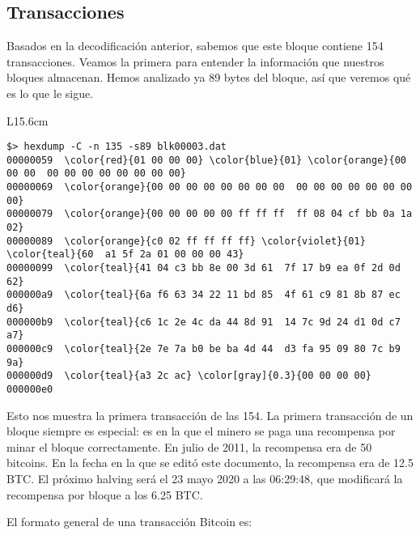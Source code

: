 \documentclass[10pt, a4paper]{article}
\theoremstyle{theorem-style}
\theoremstyle{theorem-style}
\theoremstyle{definition-style}
\theoremstyle{remark-style}
\theoremstyle{example-style}
\theoremstyle{definition-style}
\theoremstyle{remark-style}
\begin{document}
\subsection{Transacciones}

Basados en la decodificación anterior, sabemos que este bloque contiene 154 transacciones. Veamos la primera para entender la información que nuestros bloques almacenan. Hemos analizado ya 89 bytes del bloque, así que veremos qué es lo que le sigue.

\begin{table}[h]
\begin{tabular}{L{15.6cm}}
\begin{minipage}{3in}
\vspace{0.3cm}
\begin{Verbatim}[commandchars=\\\{\}]
$> hexdump -C -n 135 -s89 blk00003.dat
00000059  \color{red}{01 00 00 00} \color{blue}{01} \color{orange}{00 00 00  00 00 00 00 00 00 00 00}
00000069  \color{orange}{00 00 00 00 00 00 00 00  00 00 00 00 00 00 00 00}
00000079  \color{orange}{00 00 00 00 00 ff ff ff  ff 08 04 cf bb 0a 1a 02}
00000089  \color{orange}{c0 02 ff ff ff ff} \color{violet}{01} \color{teal}{60  a1 5f 2a 01 00 00 00 43}
00000099  \color{teal}{41 04 c3 bb 8e 00 3d 61  7f 17 b9 ea 0f 2d 0d 62}
000000a9  \color{teal}{6a f6 63 34 22 11 bd 85  4f 61 c9 81 8b 87 ec d6}
000000b9  \color{teal}{c6 1c 2e 4c da 44 8d 91  14 7c 9d 24 d1 0d c7 a7}
000000c9  \color{teal}{2e 7e 7a b0 be ba 4d 44  d3 fa 95 09 80 7c b9 9a}
000000d9  \color{teal}{a3 2c ac} \color[gray]{0.3}{00 00 00 00}
000000e0
\end{Verbatim}
\vspace{0cm}
\end{minipage}
\end{tabular}
\end{table}

Esto nos muestra la primera transacción de las 154. La primera transacción de un bloque siempre es especial: es en la que el minero se paga una recompensa por minar el bloque correctamente. En julio de 2011, la recompensa era de 50 bitcoins. En la fecha en la que se editó este documento, la recompensa era de 12.5 BTC. El próximo halving será el 23 mayo 2020 a las 06:29:48, que modificará la recompensa por bloque a los 6.25 BTC.

El formato general de una transacción Bitcoin es:
\end{document}
